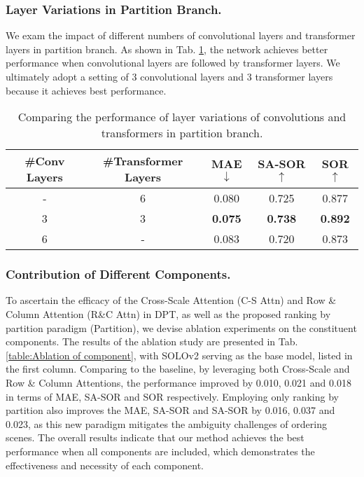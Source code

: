 \documentclass[sigconf]{acmart}
\newcommand{\tabref}[1]{Tab. \ref{#1}}
\begin{document}
\subsubsection{Layer Variations in Partition Branch.} We exam the impact of different numbers of convolutional layers and transformer layers in partition branch. As shown in \tabref{table:Ablation of DPI}, the network achieves better performance when convolutional layers are followed by transformer layers. We ultimately adopt a setting of 3 convolutional layers and 3 transformer layers because it achieves best performance.

\begin{table}[t]
\caption{Comparing the performance of layer variations of convolutions and transformers in partition branch.}
\label{table:Ablation of DPI}
\setlength{\tabcolsep}{1.5mm}
    \begin{tabular}{c|c|c|c|c}
    \toprule[1pt]
    \#Conv Layers & \#Transformer Layers & MAE$\downarrow$ & SA-SOR$\uparrow$ & SOR$\uparrow$    \\ \hline
    -             & 6                    & 0.080           & 0.725  & 0.877  \\
    3             & 3                    & \textbf{0.075}  & \textbf{0.738}  & \textbf{0.892}  \\
    6             & -                    & 0.083           & 0.720  & 0.873  \\
    \bottomrule[1pt]
    \end{tabular}
\end{table}

\subsubsection{Contribution of Different Components.} To ascertain the efficacy of the Cross-Scale Attention (C-S Attn) and Row \& Column Attention (R\&C Attn) in DPT, as well as the proposed ranking by partition paradigm (Partition), we devise ablation experiments on the constituent components. The results of the ablation study are presented in \tabref{table:Ablation of component}, with SOLOv2 \cite{wang2020solov2} serving as the base model, listed in the first column. Comparing to the baseline, by leveraging both Cross-Scale and Row \& Column Attentions, the performance improved by 0.010, 0.021 and 0.018 in terms of MAE, SA-SOR and SOR respectively. Employing only ranking by partition also improves the MAE, SA-SOR and SA-SOR by 0.016, 0.037 and 0.023, as this new paradigm mitigates the ambiguity challenges of ordering scenes. The overall results indicate that our method achieves the best performance when all components are included, which demonstrates the effectiveness and necessity of each component.
\end{document}
